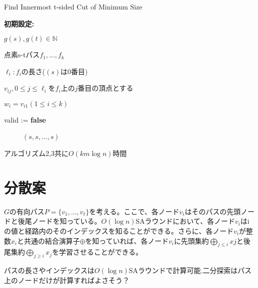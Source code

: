 \documentclass{jarticle}
\begin{document}
\begin{algorithm}[H]
  \caption{Find Innermost t-sided Cut of Minimum Size} 
  \textbf{初期設定:} \par
  $g(s),g(t)\in \mathbb{N}$ \par
  点素s-tパス$f_1,...,f_k$ \par
  $\ell_i:f_i$の長さ($(s)$は0番目) \par
  $v_{ij},0 \leq j \leq \ell_i$を$f_i$上の$j$番目の頂点とする \par
  $w_i=v_{i1}(1\leq i \leq k)$ \par
  valid := \textbf{false} \par 
  {\setlength{\baselineskip}{10pt}
  \begin{algorithmic}[1]
       
       
           
           
          \Else
          \EndIf　
          \EndWhile　
    \EndFor
    \Else
     $(s,s,...,s)$
    \EndIf
  \end{algorithmic}
  }
\end{algorithm}

アルゴリズム2,3共に$O(km\log n)$時間

\section*{分散案}

\begin{lemma}[経路収集]
  $G$の有向パス$P = \{v_1,...,v_\ell\}$を考える。ここで、各ノード$v_i$はそのパスの先頭ノードと後尾ノードを知っている。$O(\log n)$SAラウンドにおいて、各ノード$v_i$はiの値と経路内のそのインデックスを知ることができる。さらに、各ノード$v_i$が整数$x_i$と共通の結合演算子$\oplus$を知っていれば、各ノード$v_i$に先頭集約$\bigoplus_{j\leq i}xj$と後尾集約$\bigoplus_{j\geq i}x_j$を学習させることができる。
\end{lemma}
パスの長さやインデックスは$O(\log n)$SAラウンドで計算可能.二分探索はパス上のノードだけが計算すればよさそう？
\end{document}
